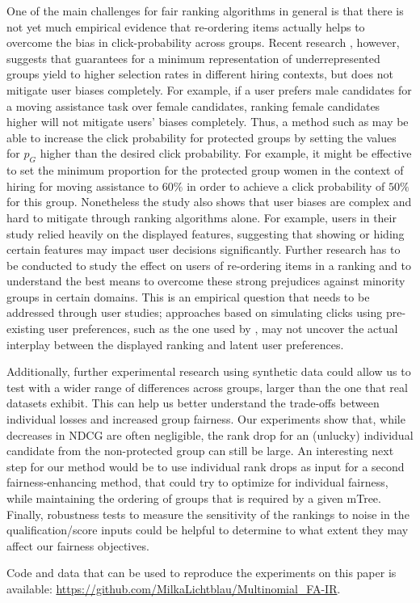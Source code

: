 One of the main challenges for fair ranking algorithms in general is that there is not yet much empirical evidence that re-ordering items actually helps to overcome the bias in click-probability across groups.
%
Recent research \cite{suhr2020does}, however, suggests that guarantees for a minimum representation of underrepresented groups yield to higher selection rates in different hiring contexts, but does not mitigate user biases completely.
%
For example, if a user prefers male candidates for a moving assistance task over female candidates, ranking female candidates higher will not mitigate users' biases completely.
%
Thus, a method such as \algoFAIR may be able to increase the click probability for protected groups by setting the values for $p_G$ higher than the desired click probability.
%
For example, it might be effective to set the minimum proportion for the protected group women in the context of hiring for moving assistance to $60\%$ in order to achieve a click probability of $50\%$ for this group.
%
Nonetheless the study also shows that user biases are complex and hard to mitigate through ranking algorithms alone.
%
For example, users in their study relied heavily on the displayed features, suggesting that showing or hiding certain features may impact user decisions significantly.
%
Further research has to be conducted to study the effect on users of re-ordering items in a ranking and to understand the best means to overcome these strong prejudices against minority groups in certain domains.
%
This is an empirical question that needs to be addressed through user studies; approaches based on simulating clicks using pre-existing user preferences, such as the one used by \citet{abdollahpouri2021user}, may not uncover the actual interplay between the displayed ranking and latent user preferences.

Additionally, further experimental research using synthetic data could allow us to test with a wider range of differences across groups, larger than the one that real datasets exhibit.
%
This can help us better understand the trade-offs between individual losses and increased group fairness.
%
Our experiments show that, while decreases in NDCG are often negligible, the rank drop for an (unlucky) individual candidate from the non-protected group can still be large.
%
An interesting next step for our method would be to use individual rank drops as input for a second fairness-enhancing method, that could try to optimize for individual fairness, while maintaining the ordering of groups that is required by a given mTree.
%
Finally, robustness tests to measure the sensitivity of the rankings to noise in the qualification/score inputs could be helpful to determine to what extent they may affect our fairness objectives.

Code and data that can be used to reproduce the experiments on this paper is available: \url{https://github.com/MilkaLichtblau/Multinomial_FA-IR}.
